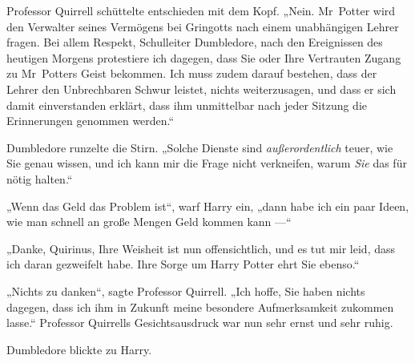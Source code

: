 Professor Quirrell schüttelte entschieden mit dem Kopf.
„Nein. Mr~Potter wird den Verwalter seines Vermögens bei Gringotts nach einem unabhängigen Lehrer fragen. Bei allem Respekt, Schulleiter Dumbledore, nach den Ereignissen des heutigen Morgens protestiere ich dagegen, dass Sie oder Ihre Vertrauten Zugang zu Mr~Potters Geist bekommen. Ich muss zudem darauf bestehen, dass der Lehrer den Unbrechbaren Schwur leistet, nichts weiterzusagen, und dass er sich damit einverstanden erklärt, dass ihm unmittelbar nach jeder Sitzung die Erinnerungen genommen werden.“

Dumbledore runzelte die Stirn.
„Solche Dienste sind \emph{außerordentlich} teuer, wie Sie genau wissen, und ich kann mir die Frage nicht verkneifen, warum \emph{Sie} das für nötig halten.“

„Wenn das Geld das Problem ist“, warf Harry ein, „dann habe ich ein paar Ideen, wie man schnell an große Mengen Geld kommen kann —“

„Danke, Quirinus, Ihre Weisheit ist nun offensichtlich, und es tut mir leid, dass ich daran gezweifelt habe. Ihre Sorge um Harry Potter ehrt Sie ebenso.“

„Nichts zu danken“, sagte Professor Quirrell.
„Ich hoffe, Sie haben nichts dagegen, dass ich ihm in Zukunft meine besondere Aufmerksamkeit zukommen lasse.“ Professor Quirrells Gesichtsausdruck war nun sehr ernst und sehr ruhig.

Dumbledore blickte zu Harry.

